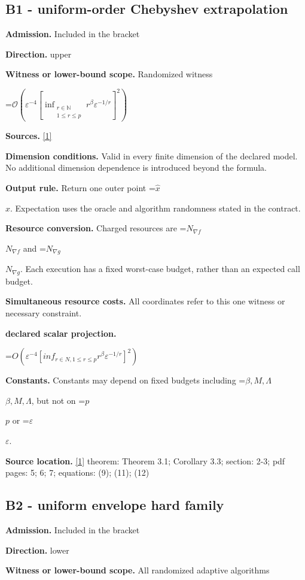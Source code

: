 \documentclass[10pt,a4paper]{article}
\newcommand{\AtlasMath}[1]{\par\begingroup\centering\setbox0=\hbox{$\displaystyle #1$}\ifdim\wd0>1.4\linewidth\typeout{ATLAS WIDE FORMULA: \the\wd0}\fi\ifdim\wd0>\linewidth\resizebox{\linewidth}{!}{\box0}\else\box0\fi\par\endgroup}
\newcommand{\AtlasInlineMath}[1]{\begingroup\setbox0=\hbox{$#1$}\ifdim\wd0>.4\linewidth\endgroup\AtlasMath{#1}\else\endgroup$#1$\fi}
\begin{document}
\subsection{B1 - uniform-order Chebyshev extrapolation}
\textbf{Admission.} Included in the bracket

\textbf{Direction.} upper

\textbf{Witness or lower-bound scope.} Randomized witness

\AtlasMath{\mathcal{O}\!\left(\varepsilon^{-4}\left[\inf_{\substack{r\in\mathbb{N}\\1\le r\le p}}r^\beta\varepsilon^{-1/r}\right]^2\right)}
\textbf{Sources.} \href{https://arxiv.org/pdf/2610.03638v2}{[1]}

\textbf{Dimension conditions.} Valid in every finite dimension of the declared model. No additional dimension dependence is introduced beyond the formula.

\textbf{Output rule.} Return one outer point \AtlasInlineMath{\widehat x}. Expectation uses the oracle and algorithm randomness stated in the contract.

\textbf{Resource conversion.} Charged resources are \AtlasInlineMath{N_{\nabla f}} and \AtlasInlineMath{N_{\nabla g}}. Each execution has a fixed worst-case budget, rather than an expected call budget.

\textbf{Simultaneous resource costs.} All coordinates refer to this one witness or necessary constraint.

\textbf{declared scalar projection.}

\AtlasMath{O(\varepsilon ^{-4} [inf_{r\in N,1\le r\le p} r^\beta  \varepsilon ^{-1/r}]^2)}
\textbf{Constants.} Constants may depend on fixed budgets including \AtlasInlineMath{\beta,M,\Lambda}, but not on \AtlasInlineMath{p} or \AtlasInlineMath{\varepsilon}.

\textbf{Source location.} \href{https://arxiv.org/pdf/2610.03638v2}{[1]} theorem: Theorem 3.1; Corollary 3.3; section: 2-3; pdf pages: 5; 6; 7; equations: (9); (11); (12)

\subsection{B2 - uniform envelope hard family}
\textbf{Admission.} Included in the bracket

\textbf{Direction.} lower

\textbf{Witness or lower-bound scope.} All randomized adaptive algorithms
\end{document}
